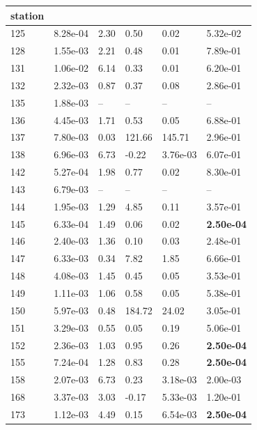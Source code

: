\begin{figure}[htbp!]
{\begin{minipage}[t]{0.48\linewidth}
\begin{tabular}{llllll}
        station &  &  &  &  &  \\
        \midrule
                    125 & 8.28e-04 & 2.30 & 0.50 & 0.02 & 5.32e-02\\
                    128 & 1.55e-03 & 2.21 & 0.48 & 0.01 & 7.89e-01\\
                    131 & 1.06e-02 & 6.14 & 0.33 & 0.01 & 6.20e-01\\
                    132 & 2.32e-03 & 0.87 & 0.37 & 0.08 & 2.86e-01\\
                    135 & 1.88e-03 & -- & -- & -- & --\\
                    136 & 4.45e-03 & 1.71 & 0.53 & 0.05 & 6.88e-01\\
                    137 & 7.80e-03 & 0.03 & 121.66 & 145.71 & 2.96e-01\\
                    138 & 6.96e-03 & 6.73 & -0.22 & 3.76e-03 & 6.07e-01\\
                    142 & 5.27e-04 & 1.98 & 0.77 & 0.02 & 8.30e-01\\
                    143 & 6.79e-03 & -- & -- & -- & --\\
                    144 & 1.95e-03 & 1.29 & 4.85 & 0.11 & 3.57e-01\\
                    145 & 6.33e-04 & 1.49 & 0.06 & 0.02 & \textbf{2.50e-04}\\
                    146 & 2.40e-03 & 1.36 & 0.10 & 0.03 & 2.48e-01\\
                    147 & 6.33e-03 & 0.34 & 7.82 & 1.85 & 6.66e-01\\
                    148 & 4.08e-03 & 1.45 & 0.45 & 0.05 & 3.53e-01\\
                    149 & 1.11e-03 & 1.06 & 0.58 & 0.05 & 5.38e-01\\
                    150 & 5.97e-03 & 0.48 & 184.72 & 24.02 & 3.05e-01\\
                    151 & 3.29e-03 & 0.55 & 0.05 & 0.19 & 5.06e-01\\
                    152 & 2.36e-03 & 1.03 & 0.95 & 0.26 & \textbf{2.50e-04}\\
                    155 & 7.24e-04 & 1.28 & 0.83 & 0.28 & \textbf{2.50e-04}\\
                    158 & 2.07e-03 & 6.73 & 0.23 & 3.18e-03 & 2.00e-03\\
                    168 & 3.37e-03 & 3.03 & -0.17 & 5.33e-03 & 1.20e-01\\
                    173 & 1.12e-03 & 4.49 & 0.15 & 6.54e-03 & \textbf{2.50e-04}\\

\end{tabular}
\end{minipage}}
\end{figure}
